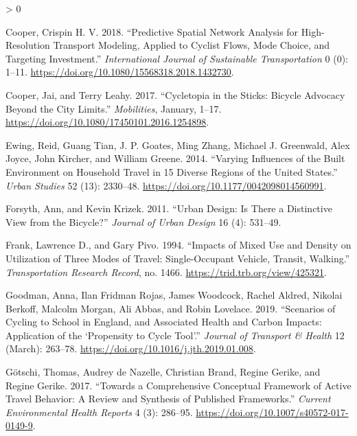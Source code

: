 \documentclass[galley]{jtlu-article-2col}
\newlength{\cslhangindent}
\newenvironment{CSLReferences}[2] %
 {%
  \setlength{\parindent}{0pt}
  \ifodd #1 \everypar{\setlength{\hangindent}{\cslhangindent}}\ignorespaces\fi
  \ifnum #2 > 0
  \setlength{\parskip}{#2\baselineskip}
  \fi
 }%
 {}
\begin{document}
\begin{CSLReferences}{1}{0}
\leavevmode\hypertarget{ref-cooper_predictive_2018}{}%
Cooper, Crispin H. V. 2018. {``Predictive Spatial Network Analysis for High-Resolution Transport Modeling, Applied to Cyclist Flows, Mode Choice, and Targeting Investment.''} \emph{International Journal of Sustainable Transportation} 0 (0): 1--11. \url{https://doi.org/10.1080/15568318.2018.1432730}.

\leavevmode\hypertarget{ref-cooper_cycletopia_2017}{}%
Cooper, Jai, and Terry Leahy. 2017. {``Cycletopia in the Sticks: Bicycle Advocacy Beyond the City Limits.''} \emph{Mobilities}, January, 1--17. \url{https://doi.org/10.1080/17450101.2016.1254898}.

\leavevmode\hypertarget{ref-ewing_varying_2014}{}%
Ewing, Reid, Guang Tian, J. P. Goates, Ming Zhang, Michael J. Greenwald, Alex Joyce, John Kircher, and William Greene. 2014. {``Varying Influences of the Built Environment on Household Travel in 15 Diverse Regions of the {United States}.''} \emph{Urban Studies} 52 (13): 2330--48. \url{https://doi.org/10.1177/0042098014560991}.

\leavevmode\hypertarget{ref-forsyth_urban_2011}{}%
Forsyth, Ann, and Kevin Krizek. 2011. {``Urban Design: Is There a Distinctive View from the Bicycle?''} \emph{Journal of Urban Design} 16 (4): 531--49.

\leavevmode\hypertarget{ref-frank_impacts_1994}{}%
Frank, Lawrence D., and Gary Pivo. 1994. {``Impacts of Mixed Use and Density on Utilization of Three Modes of Travel: {Single}-Occupant Vehicle, Transit, Walking.''} \emph{Transportation Research Record}, no. 1466. \url{https://trid.trb.org/view/425321}.

\leavevmode\hypertarget{ref-goodman_scenarios_2019}{}%
Goodman, Anna, Ilan Fridman Rojas, James Woodcock, Rachel Aldred, Nikolai Berkoff, Malcolm Morgan, Ali Abbas, and Robin Lovelace. 2019. {``Scenarios of Cycling to School in {England}, and Associated Health and Carbon Impacts: {Application} of the {`{Propensity} to {Cycle Tool}'}.''} \emph{Journal of Transport \& Health} 12 (March): 263--78. \url{https://doi.org/10.1016/j.jth.2019.01.008}.

\leavevmode\hypertarget{ref-gotschi_comprehensive_2017}{}%
Götschi, Thomas, Audrey de Nazelle, Christian Brand, Regine Gerike, and Regine Gerike. 2017. {``Towards a {Comprehensive Conceptual Framework} of {Active Travel Behavior}: A {Review} and {Synthesis} of {Published Frameworks}.''} \emph{Current Environmental Health Reports} 4 (3): 286--95. \url{https://doi.org/10.1007/s40572-017-0149-9}.


\end{CSLReferences}
\end{document}
